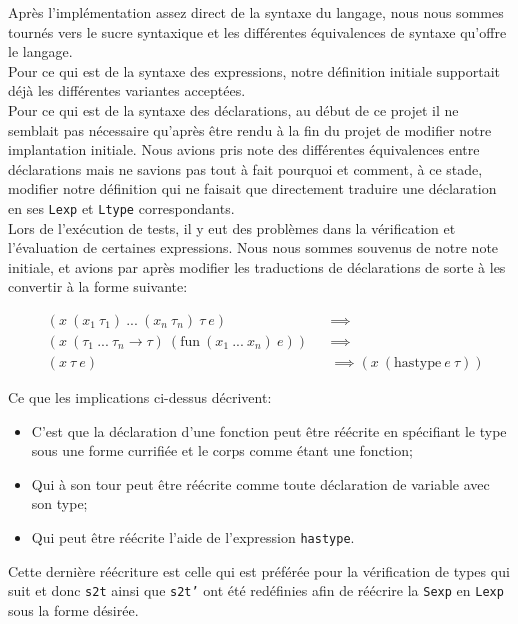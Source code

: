\documentclass[11pt, titlepage]{article}
\begin{document}
Après l'implémentation assez direct de la syntaxe du langage, nous nous sommes
tournés vers le sucre syntaxique et les différentes équivalences de syntaxe
qu'offre le langage. \\

Pour ce qui est de la syntaxe des expressions, notre définition initiale
supportait déjà les différentes variantes acceptées. \\

Pour ce qui est de la syntaxe des déclarations, au début de ce projet il ne
semblait pas nécessaire qu'après être rendu à la fin du projet de modifier
notre implantation initiale. Nous avions pris note des différentes équivalences
entre déclarations mais ne savions pas tout à fait pourquoi et comment, à ce
stade, modifier notre définition qui ne faisait que directement traduire une
déclaration en ses \texttt{Lexp} et \texttt{Ltype} correspondants. \\
Lors de l'exécution de tests, il y eut des problèmes dans la vérification et
l'évaluation de certaines expressions. Nous nous sommes souvenus de notre note
initiale, et avions par après modifier les traductions de déclarations de sorte
à les convertir à la forme suivante:

\begin{equation*}
    \begin{aligned}
        & (x \ (x_1 \ \tau_1) \ ... \ (x_n \ \tau_n) \ \tau \ e) && \implies \\
        & (x \ (\tau_1 \ ... \ \tau_n \rightarrow \tau) \ (\text{fun} \
            (x_1 \ ... \ x_n) \ e)) && \implies \\
        & (x \ \tau \ e) && \implies (x \ (\text{hastype} \ e \ \tau))
    \end{aligned}
\end{equation*}

Ce que les implications ci-dessus décrivent:

\begin{itemize}
    \item C'est que la déclaration d'une fonction peut être réécrite en
    spécifiant le type sous une forme currifiée et le corps comme étant une
    fonction;
    \item Qui à son tour peut être réécrite comme toute déclaration de variable
    avec son type;
    \item Qui peut être réécrite l'aide de l'expression \texttt{hastype}.
\end{itemize}
Cette dernière réécriture est celle qui est préférée pour la vérification de
types qui suit et donc \texttt{s2t} ainsi que \texttt{s2t'} ont été redéfinies
afin de réécrire la \texttt{Sexp} en \texttt{Lexp} sous la forme désirée.
\end{document}
